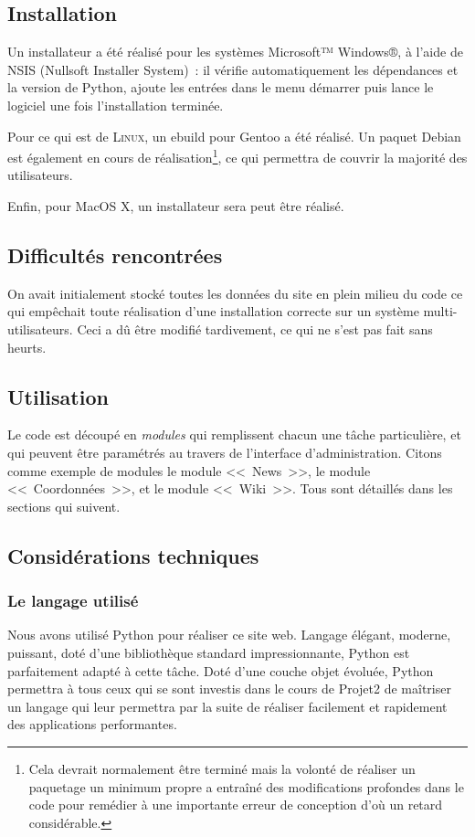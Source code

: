 \documentclass[final,11pt,a4paper,twoside,titlepage]{article}
\begin{document}
{    \subsection{Installation}
      Un installateur a été réalisé pour les systèmes Microsoft™ Windows®, à
      l'aide de NSIS (Nullsoft Installer System)~: il vérifie automatiquement les
      dépendances et la version de Python, ajoute les entrées dans le menu
      démarrer puis lance le logiciel une fois l'installation terminée.
      
      Pour ce qui est de \textsc{Linux}, un ebuild pour Gentoo a été réalisé. Un
      paquet Debian est également en cours de réalisation\footnote{Cela devrait
        normalement être terminé mais la volonté de réaliser un paquetage un minimum
        propre a entraîné des modifications profondes dans le code pour remédier à
        une importante erreur de conception d'où un retard considérable.}, ce qui
      permettra de couvrir la majorité des utilisateurs.

      Enfin, pour MacOS X, un installateur sera peut être réalisé.

    \subsection{Difficultés rencontrées}
      On avait initialement stocké toutes les données du site en plein milieu du code
      ce qui empêchait toute réalisation d'une installation correcte sur un système
      multi-utilisateurs. Ceci a dû être modifié tardivement, ce qui ne s'est pas fait
      sans heurts.

    \subsection{Utilisation}
      Le code est découpé en \emph{modules} qui remplissent chacun une tâche
      particulière, et qui peuvent être paramétrés au travers de l'interface
      d'administration. Citons comme exemple de modules le module <<~News~>>, le
      module <<~Coordonnées~>>, et le module <<~Wiki~>>. Tous sont détaillés
      dans les sections qui suivent.
      
    \subsection{Considérations techniques}
      \subsubsection{Le langage utilisé}
        Nous avons utilisé Python pour réaliser ce site web. Langage élégant,
        moderne, puissant, doté d'une bibliothèque standard impressionnante,
        Python est parfaitement adapté à cette tâche. Doté d'une couche objet
        évoluée, Python permettra à tous ceux qui se sont investis dans le cours
        de Projet2 de maîtriser un langage qui leur permettra par la
        suite de réaliser facilement et rapidement des applications performantes.

}
\end{document}
